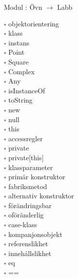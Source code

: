 
    Modul : Övn  $\rightarrow$ Labb 
    \begin{multicols}{3}\SlideFontTiny
    $\square$ objektorientering \\
$\square$ klass \\
$\square$ instans \\
$\square$ Point \\
$\square$ Square \\
$\square$ Complex \\
$\square$ Any \\
$\square$ isInstanceOf \\
$\square$ toString \\
$\square$ new \\
$\square$ null \\
$\square$ this \\
$\square$ accessregler \\
$\square$ private \\
$\square$ private[this] \\
$\square$ klassparameter \\
$\square$ primär konstruktor \\
$\square$ fabriksmetod \\
$\square$ alternativ konstruktor \\
$\square$ förändringsbar \\
$\square$ oföränderlig \\
$\square$ case-klass \\
$\square$ kompanjonsobjekt \\
$\square$ referenslikhet \\
$\square$ innehållslikhet \\
$\square$ eq \\
$\square$ == \\
    \end{multicols}
    